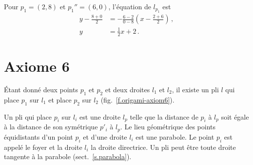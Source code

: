 \begin{example}
Pour $p_1=(2,8)$ et $p_1''=(6,0)$, l'équation de  $l_{p_1}$ est
%
\begin{align*}
y-\frac{8+0}{2}&=-\frac{6-2}{0-8}\left(x-\frac{2+6}{2}\right)\,,\\
y&=\frac{1}{2}x+2\,.
\end{align*}
\end{example}




\section{Axiome 6}\label{s.ax6}

\begin{axiom}
Étant donné deux points $p_1$ et $p_2$ et deux droites $l_1$ et $l_2$, il existe un pli $l$ qui place $p_1$ sur $l_1$ et place $p_2$ sur $l_2$ (fig.~\ref{f.origami-axiom6}).
\end{axiom}

Un pli qui place $p_i$ sur $l_i$ est une droite $l_p$ telle que la distance de $p_i$ à $l_p$ soit égale à la distance de son symétrique $p'_i$ à $l_p$. Le lieu géométrique des points équidistants d'un point $p_i$ et d'une droite $l_i$ est une parabole. Le point $p_i$ est appelé le foyer et la droite $l_i$ la droite directrice. Un pli peut être toute droite tangente à la parabole 
 (sect.~\ref{s.parabola}).

